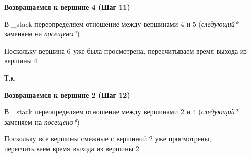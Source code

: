 \documentclass[a4paper]{article}
\begin{document}
\textbf{Возвращаемся к вершине 4 (Шаг 11)}
  \begin{figure}[!h]
  \end{figure}
\par
  В \_stack переопределяем отношение между вершинами 4 и 5 (\textit{следующий*} заменяем на \textit{посещено*})\par
  Поскольку вершина 6 уже была просмотрена, пересчитываем время выхода из вершины 4\par
  Т.к.
\newpage

\textbf{Возвращаемся к вершине 2 (Шаг 12)}
  \begin{figure}[!h]
  \end{figure}
\par
  В \_stack переопределяем отношение между вершинами 2 и 4 (\textit{следующий*} заменяем на \textit{посещено*})\par
  Поскольку все вершины смежные с вершиной 2 уже просмотрены, пересчитываем время выхода из вершины 2\par
\newpage
\end{document}

